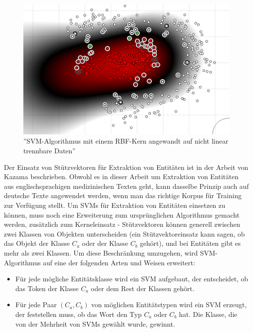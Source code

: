 \begin{figure}
\centering
\includegraphics[width=\textwidth,angle=90]{Bilder/svm-nonlinear-rbf.png}
\caption{''SVM-Algorithmus mit einem RBF-Kern angewandt auf nicht linear trennbare Daten''}
\label{fig:SVM-NONLINEAR-ISSUE}
\end{figure}

Der Einsatz von Stützvektoren für Extraktion von Entitäten ist in der Arbeit von Kazama\cite{kazama2002tuning} beschrieben. Obwohl es in dieser Arbeit um Extraktion von Entitäten aus englischsprachigen medizinischen Texten geht, kann dasselbe Prinzip auch auf deutsche Texte angewendet werden, wenn man das richtige Korpus für Training zur Verfügung stellt. Um SVMs für Extraktion von Entitäten einsetzen zu können, muss noch eine Erweiterung zum ursprünglichen Algorithmus gemacht werden, zusätzlich zum Kerneleinsatz - Stützvektoren können generell zwischen zwei Klassen von Objekten unterscheiden (ein Stützvektoreinsatz kann sagen, ob das Objekt der Klasse $C_a$ oder der Klasse $C_b$ gehört), und bei Entitäten gibt es mehr als zwei Klassen. Um diese Beschränkung umzugehen, wird SVM-Algorithmus auf eine der folgenden Arten und Weisen erweitert:

\begin{itemize}
\item Für jede mögliche Entitätsklasse wird ein SVM aufgebaut, der entscheidet, ob das Token der Klasse $C_a$ oder dem Rest der Klassen gehört.
\item Für jede Paar $(C_a, C_b)$ von möglichen Entitätstypen wird ein SVM erzeugt, der feststellen muss, ob das Wort den Typ $C_a$ oder $C_b$ hat. Die Klasse, die von der Mehrheit von SVMs gewählt wurde, gewinnt.
\end{itemize}

